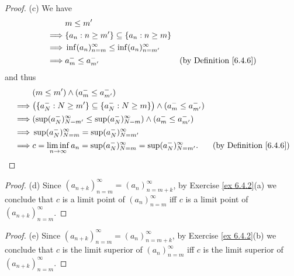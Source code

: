 \begin{proof}{(c)}
    We have
    \begin{align*}
                 & m \leq m'                                                                                    \\
        \implies & \{a_n : n \geq m'\} \subseteq \{a_n : n \geq m\}                                             \\
        \implies & \inf(a_n)_{n = m}^\infty \leq \inf(a_n)_{n = m'}^\infty                                      \\
        \implies & a_m^- \leq a_{m'}^-                                     & \text{(by Definition \ref{6.4.6})}
    \end{align*}
    and thus
    \begin{align*}
                 & (m \leq m') \land (a_m^- \leq a_{m'}^-)                                                                                         \\
        \implies & \big(\{a_N^- : N \geq m'\} \subseteq \{a_N^- : N \geq m\}\big) \land (a_m^- \leq a_{m'}^-)                                      \\
        \implies & (\sup(a_N^-)_{N = m'}^\infty \leq \sup(a_N^-)_{N = m}^\infty) \land (a_m^- \leq a_{m'}^-)                                       \\
        \implies & \sup(a_N^-)_{N = m}^\infty = \sup(a_N^-)_{N = m'}^\infty                                                                        \\
        \implies & c = \liminf_{n \to \infty} a_n = \sup(a_N^-)_{N = m}^\infty = \sup(a_N^-)_{N = m'}^\infty. & \text{(by Definition \ref{6.4.6})}
    \end{align*}
\end{proof}

\begin{proof}{(d)}
    Since \((a_{n + k})_{n = m}^\infty = (a_n)_{n = m + k}^\infty\), by Exercise \ref{ex 6.4.2}(a) we conclude that \(c\) is a limit point of \((a_n)_{n = m}^\infty\) iff \(c\) is a limit point of \((a_{n + k})_{n = m}^\infty\).
\end{proof}

\begin{proof}{(e)}
    Since \((a_{n + k})_{n = m}^\infty = (a_n)_{n = m + k}^\infty\), by Exercise \ref{ex 6.4.2}(b) we conclude that \(c\) is the limit superior of \((a_n)_{n = m}^\infty\) iff \(c\) is the limit superior of \((a_{n + k})_{n = m}^\infty\).
\end{proof}

